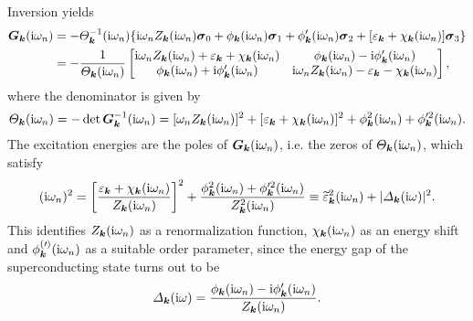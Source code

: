 %
Inversion yields
%
\begin{align*}
    \boldsymbol G_{\boldsymbol k}(\mathrm i \omega_n) &= -\varTheta_{\boldsymbol k}^{-1}(\mathrm i \omega_n) \{
        \mathrm i \omega_n Z_{\boldsymbol k}(\mathrm i \omega_n) \boldsymbol \sigma_0
        + \phi _{\boldsymbol k}(\mathrm i \omega_n) \boldsymbol \sigma_1
        + \phi'_{\boldsymbol k}(\mathrm i \omega_n) \boldsymbol \sigma_2
        + [\varepsilon_{\boldsymbol k} + \chi_{\boldsymbol k}(\mathrm i \omega_n)] \boldsymbol \sigma_3 \}
    \\
    &= -\frac 1 {\varTheta_{\boldsymbol k}(\mathrm i \omega_n)}
    \begin{bmatrix}
        \mathrm i \omega_n Z_{\boldsymbol k}(\mathrm i \omega_n)
        + \varepsilon_{\boldsymbol k} + \chi_{\boldsymbol k}(\mathrm i \omega_n) &
        \phi_{\boldsymbol k}(\mathrm i \omega_n) - \mathrm i \phi'_{\boldsymbol k}(\mathrm i \omega_n) \\
        \phi_{\boldsymbol k}(\mathrm i \omega_n) + \mathrm i \phi'_{\boldsymbol k}(\mathrm i \omega_n) &
        \mathrm i \omega_n Z_{\boldsymbol k}(\mathrm i \omega_n)
        - \varepsilon_{\boldsymbol k} - \chi_{\boldsymbol k}(\mathrm i \omega_n)
    \end{bmatrix},
\end{align*}
%
where the denominator is given by
%
\begin{equation*}
    \varTheta_{\boldsymbol k}(\mathrm i \omega_n) = -\det \boldsymbol G_{\boldsymbol k}^{-1}(\mathrm i \omega_n)
    = [\omega_n Z_{\boldsymbol k}(\mathrm i \omega_n)]^2
    + [\varepsilon_{\boldsymbol k} + \chi_{\boldsymbol k}(\mathrm i \omega_n)]^2
    + \phi ^2_{\boldsymbol k}(\mathrm i \omega_n)
    + \phi'^2_{\boldsymbol k}(\mathrm i \omega_n).
\end{equation*}
%
The excitation energies are the poles of $\boldsymbol G_{\boldsymbol k}(\mathrm i \omega_n)$, i.e.
the zeros of $\varTheta_{\boldsymbol k}(\mathrm i \omega_n)$, which satisfy
%
\begin{align*}
    (\mathrm i \omega_n)^2 = \left[ \frac
        {\varepsilon_{\boldsymbol k} + \chi_{\boldsymbol k}(\mathrm i \omega_n)}
        {Z_{\boldsymbol k}(\mathrm i \omega_n)}
    \right]^2
    + \frac
        {\phi_{\boldsymbol k}^2(\mathrm i \omega_n) + \phi'^2_{\boldsymbol k}(\mathrm i \omega_n)}
        {Z_{\boldsymbol k}^2(\mathrm i \omega_n)}
    \equiv \widetilde {\varepsilon}^2_{\boldsymbol k}(\mathrm i \omega_n)
    + |\varDelta_{\boldsymbol k}(\mathrm i \omega)|^2.
\end{align*}
%
This identifies $Z_{\boldsymbol k}(\mathrm i \omega_n)$ as a renormalization function,
$\chi_{\boldsymbol k}(\mathrm i \omega_n)$ as an energy shift and $\phi^{(\prime)}_{\boldsymbol k}(\mathrm i
\omega_n)$ as a suitable order parameter, since the energy gap of the
superconducting state turns out to be
%
\begin{align*}
    \varDelta_{\boldsymbol k}(\mathrm i \omega) = \frac
        {\phi_{\boldsymbol k}(\mathrm i \omega_n) - \mathrm i \phi'_{\boldsymbol k}(\mathrm i \omega_n)}
        {Z_{\boldsymbol k}(\mathrm i \omega_n)}.
\end{align*}

\newpage


